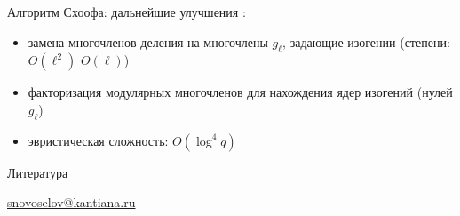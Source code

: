 \documentclass{beamer}
\begin{document}
\begin{frame}{Алгоритм Схоофа: дальнейшие улучшения}
    :
    \begin{itemize}
        \item замена многочленов деления на многочлены $g_\ell$, задающие изогении (степени: $O(\ell^2)$ \structure{$\implies$} $O(\ell)$)
        \item факторизация модулярных многочленов для нахождения ядер изогений (нулей $g_\ell$)
        \item эвристическая сложность: $O(\log^4{q})$
    \end{itemize}
\end{frame}

\begin{frame}{Литература}
    \nocite{Blake1999}
    \nocite{Schoof1985}
    \nocite{CohenFrey+2005}
    \nocite{Washington2008}
    \printbibliography

    \begin{center}
        \begin{tcolorbox}[enhanced,hbox,colback=block-green-color-bg,colframe=subsection-color!120,title=Контакты,center title]
            \begin{varwidth}{\textwidth}
                \begin{center}
                    \href{mailto:snovoselov@kantiana.ru}{snovoselov@kantiana.ru}
                \end{center}
            \end{varwidth}
        \end{tcolorbox}	
    \end{center}
\end{frame}
\end{document}
